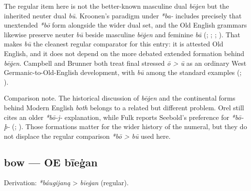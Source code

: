 \documentclass[
  british,
  a4paper,
]{article}
\begin{document}
The regular item here is not the better-known masculine dual
\emph{bēġen} but the inherited neuter dual \emph{bū}. Kroonen's paradigm
under \emph{*ba-} includes precisely that unextended \emph{*bō} form
alongside the wider dual set, and the Old English grammars likewise
preserve neuter \emph{bū} beside masculine \emph{bēġen} and feminine
\emph{bā} (;
;
;
). That makes \emph{bū} the
cleanest regular comparator for this entry: it is attested Old English,
and it does not depend on the more debated extended formation behind
\emph{bēġen}. Campbell and Brunner both treat final stressed \emph{ō
\textgreater{} ū} as an ordinary West Germanic-to-Old-English
development, with \emph{bū} among the standard examples
(;
).

Comparison note. The historical discussion of \emph{bēġen} and the
continental forms behind Modern English \emph{both} belongs to a related
but different problem. Orel still cites an older \emph{*bō-j-}
explanation, while Fulk reports Seebold's preference for \emph{*bō-þ-}
(; ). Those formations matter for the wider history of the
numeral, but they do not displace the regular comparison \emph{*bō
\textgreater{} bū} used here.

\subsection{bow --- OE bīeġan}\label{bow-oe-bux12beux121an}

Derivation: \emph{*báugijaną} \textgreater{} \emph{bīeġan} (regular).

\begingroup
\setlength{\fboxsep}{6pt}
\end{document}
